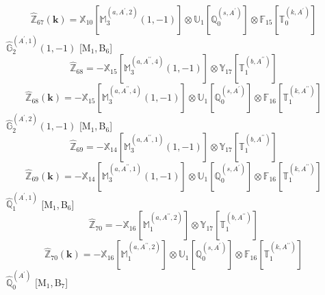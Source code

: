 \documentclass[fleqn,10pt,landscape]{article}
\begin{document}
\begin{itemize}
\begin{dmath*}
\end{dmath*}
\begin{dmath*}
\hat{\mathbb{Z}}_{67}(\bm{k})=\mathbb{X}_{10}[\mathbb{M}_{3}^{(a,A^{\prime},2)}(1,-1)] \otimes\mathbb{U}_{1}[\mathbb{Q}_{0}^{(s,A^{\prime})}] \otimes\mathbb{F}_{15}[\mathbb{T}_{0}^{(k,A^{\prime})}]
\end{dmath*}
\vspace{4mm}
\noindent {} $\,\,\,\hat{\mathbb{G}}_{2}^{(A^{\prime},1)}(1,-1)$ [M$_{1}$,\,B$_{6}$]
\begin{dmath*}
\hat{\mathbb{Z}}_{68}=- \mathbb{X}_{15}[\mathbb{M}_{3}^{(a,A^{\prime\prime},4)}(1,-1)] \otimes\mathbb{Y}_{17}[\mathbb{T}_{1}^{(b,A^{\prime\prime})}]
\end{dmath*}
\begin{dmath*}
\hat{\mathbb{Z}}_{68}(\bm{k})=- \mathbb{X}_{15}[\mathbb{M}_{3}^{(a,A^{\prime\prime},4)}(1,-1)] \otimes\mathbb{U}_{1}[\mathbb{Q}_{0}^{(s,A^{\prime})}] \otimes\mathbb{F}_{16}[\mathbb{T}_{1}^{(k,A^{\prime\prime})}]
\end{dmath*}
\vspace{4mm}
\noindent {} $\,\,\,\hat{\mathbb{G}}_{2}^{(A^{\prime},2)}(1,-1)$ [M$_{1}$,\,B$_{6}$]
\begin{dmath*}
\hat{\mathbb{Z}}_{69}=- \mathbb{X}_{14}[\mathbb{M}_{3}^{(a,A^{\prime\prime},1)}(1,-1)] \otimes\mathbb{Y}_{17}[\mathbb{T}_{1}^{(b,A^{\prime\prime})}]
\end{dmath*}
\begin{dmath*}
\hat{\mathbb{Z}}_{69}(\bm{k})=- \mathbb{X}_{14}[\mathbb{M}_{3}^{(a,A^{\prime\prime},1)}(1,-1)] \otimes\mathbb{U}_{1}[\mathbb{Q}_{0}^{(s,A^{\prime})}] \otimes\mathbb{F}_{16}[\mathbb{T}_{1}^{(k,A^{\prime\prime})}]
\end{dmath*}
\vspace{4mm}
\noindent {} $\,\,\,\hat{\mathbb{Q}}_{1}^{(A^{\prime},1)}$ [M$_{1}$,\,B$_{6}$]
\begin{dmath*}
\hat{\mathbb{Z}}_{70}=- \mathbb{X}_{16}[\mathbb{M}_{1}^{(a,A^{\prime\prime},2)}] \otimes\mathbb{Y}_{17}[\mathbb{T}_{1}^{(b,A^{\prime\prime})}]
\end{dmath*}
\begin{dmath*}
\hat{\mathbb{Z}}_{70}(\bm{k})=- \mathbb{X}_{16}[\mathbb{M}_{1}^{(a,A^{\prime\prime},2)}] \otimes\mathbb{U}_{1}[\mathbb{Q}_{0}^{(s,A^{\prime})}] \otimes\mathbb{F}_{16}[\mathbb{T}_{1}^{(k,A^{\prime\prime})}]
\end{dmath*}
\vspace{4mm}
\noindent {} $\,\,\,\hat{\mathbb{Q}}_{0}^{(A^{\prime})}$ [M$_{1}$,\,B$_{7}$]

\end{itemize}
\end{document}
